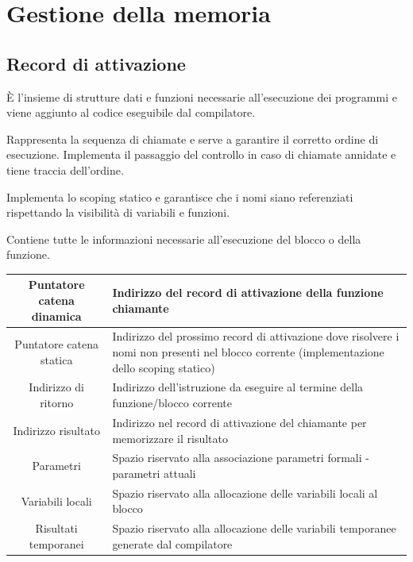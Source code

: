 \newpage
\section{Gestione della memoria}
\subsection{Record di attivazione}
\begin{definition}
	È l'insieme di strutture dati e funzioni necessarie all'esecuzione dei programmi  e viene aggiunto al codice eseguibile dal compilatore.
\end{definition}
\begin{definition}
	Rappresenta la sequenza di chiamate e serve a garantire il corretto ordine di esecuzione. Implementa il passaggio del controllo in caso di chiamate annidate e tiene traccia dell'ordine.
\end{definition}
\begin{definition}
	Implementa lo scoping statico e garantisce che i nomi siano referenziati rispettando la visibilità di variabili e funzioni. 
\end{definition}
\begin{definition}
	Contiene tutte le informazioni necessarie all'esecuzione del blocco o della funzione.
\end{definition}
\begin{tabular} { |c|p{250px}|}
	\hline
	Puntatore catena dinamica  & Indirizzo del record di attivazione della funzione chiamante\\
	\hline
	Puntatore catena statica & Indirizzo del prossimo record di attivazione dove risolvere i nomi
		non presenti nel blocco corrente (implementazione dello scoping
		statico) \\
	\hline
	Indirizzo di ritorno & Indirizzo dell’istruzione da eseguire al termine della funzione/blocco corrente \\
	\hline
	Indirizzo risultato & Indirizzo nel record di attivazione del chiamante per memorizzare il risultato \\
	\hline
	Parametri & Spazio riservato alla associazione parametri formali - parametri attuali \\
	\hline
	Variabili locali & Spazio riservato alla allocazione delle variabili locali al blocco \\
	\hline
	Risultati temporanei & Spazio riservato alla allocazione delle variabili temporanee generate dal compilatore \\
	\hline
\end{tabular}

